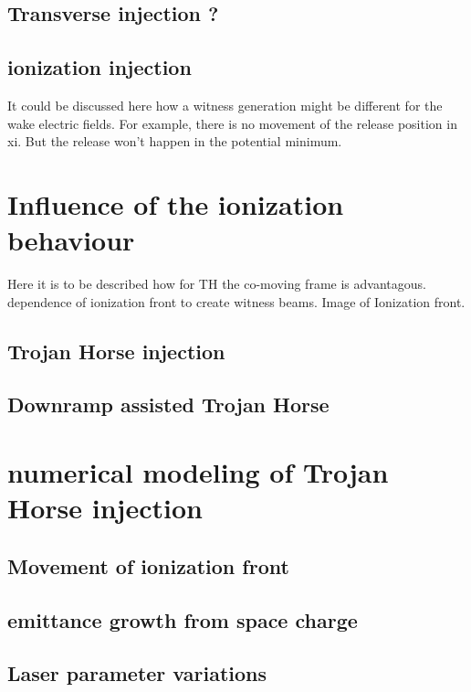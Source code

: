 \subsection{Transverse injection ?}
\subsection{ionization injection}
	It could be discussed here how a witness generation might be different for the wake electric fields.
	For example, there is no movement of the release position in xi. But the release won't happen in the potential minimum.
	
\section{Influence of the ionization behaviour}
	Here it is to be described how for TH the co-moving frame is advantagous. dependence of ionization front to 
	create witness beams.
	Image of Ionization front.
	
	

\subsection{Trojan Horse injection}
\label{sec:Theory_TrojanHorse}
	
\subsection{Downramp assisted Trojan Horse}

\section{numerical modeling of Trojan Horse injection}

\subsection{Movement of ionization front}
\subsection{emittance growth from space charge}
\subsection{Laser parameter variations}
	
